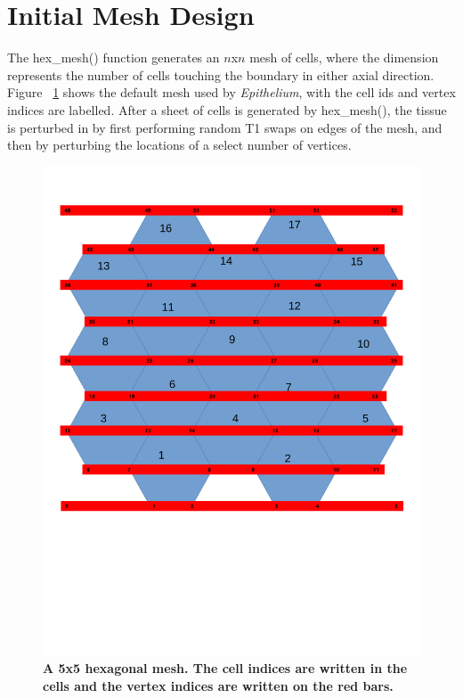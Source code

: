 \section{Initial Mesh Design}
The hex\_mesh() function generates an $n$x$n$ mesh of cells, where the 
dimension represents the number of cells touching the boundary in 
either axial direction. Figure ~\ref{fig:mesh} shows the default mesh 
used by \emph{Epithelium}, with the cell ids and vertex indices are 
labelled. After a sheet of cells is generated by 
hex\_mesh(), the tissue is perturbed in by first performing random 
T1 swaps on edges of the mesh, and then by perturbing the locations of a select 
number of vertices.

\begin{figure}
\centering
\includegraphics[height=0.7\textheight]{../diagrams/vert_mesh.pdf}
\caption[A 5x5 Hexagonal Mesh.]{\textbf{A 5x5 hexagonal mesh. The cell 
indices are written in the cells and the vertex indices are written on the red bars.}}
\label{fig:mesh}
\end{figure}
